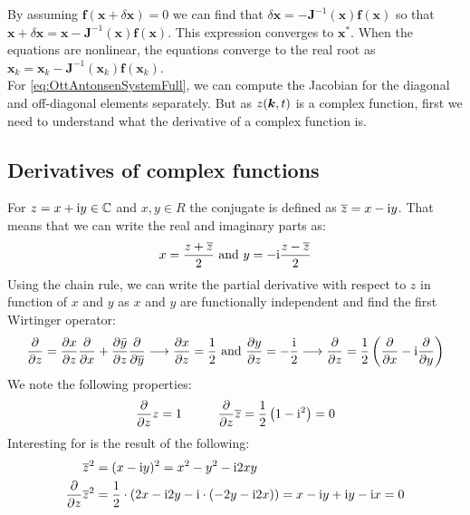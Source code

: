 By assuming $\boldsymbol{f}(\boldsymbol{x}+\delta \boldsymbol{x}) = 0$ we can find that $\delta \boldsymbol{x} = -\boldsymbol{J}^{-1}( \boldsymbol{x}) \boldsymbol{f}(\boldsymbol{x})$ so that $\boldsymbol{x} + \delta \boldsymbol{x} =  \boldsymbol{x} - \boldsymbol{J}^{-1} (\boldsymbol{x}) \boldsymbol{f}(\boldsymbol{x})$. This expression converges to $\boldsymbol{x^\ast}$. When the equations are nonlinear, the equations converge to the real root as $\boldsymbol{x}_k =  \boldsymbol{x}_k - \boldsymbol{J}^{-1} ( \boldsymbol{x}_k)\boldsymbol{f}(\boldsymbol{x}_k)$. \\

For \eqref{eq:OttAntonsenSystemFull}, we can compute the Jacobian for the diagonal and off-diagonal elements separately. But as $z({\boldsymbol{k}},t)$ is a complex function, first we need to understand what the derivative of a complex function is. 


\subsection{Derivatives of complex functions}
For $z = x + {\rm{i}} y \in {\mathbb{C}}$ and $x,y \in R$ the conjugate is defined as $\overline{z} = x - {\rm{i}} y$. That means that we can write the real and imaginary parts as:
\begin{align*}
x = \frac{z + \overline{z}}{2} \text{  and   }   y = -{\rm{i}} \frac{z - \overline{z}}{2}
\end{align*}
Using the chain rule, we can write the partial derivative with respect to $z$ in function of $x$ and $y$ as $x$ and $y$ are functionally independent and find the first Wirtinger operator:
\begin{align*}
\frac{\partial}{\partial z} =\frac{\partial x}{\partial z} \frac{\partial}{\partial x}+\frac{\partial \bar{y}}{\partial z} \frac{\partial}{\partial \overline{y}} 
\longrightarrow \frac{\partial x}{\partial z} = \frac{1}{2} \text{   and   } \frac{\partial y}{\partial z} =  - \frac{{\rm{i}}}{2} 
\longrightarrow \frac{\partial}{\partial z} = \frac{1}{2}\left(\frac{\partial}{\partial x} - {\rm{i}} \frac{\partial}{\partial y}\right)
\end{align*}
We note the following properties:
\begin{align*}
\frac{\partial}{\partial z} z = 1 \hspace{10mm} \frac{\partial}{\partial z}\overline{z} = \frac{1}{2}\left(1 - \ic^2 \right) = 0
\end{align*}
Interesting for is the result of the following: 
\begin{align*}
\overline{z}^2 &= (x - {\rm{i}} y)^2 = x^2 - y^2 - {\rm{i}} 2xy \\
\frac{\partial}{\partial z} \overline{z}^2 &=  \frac{1}{2}\cdot(2x -{\rm{i}} 2y - {\rm{i}}\cdot(-2y -{\rm{i}} 2x)) = x -{\rm{i}} y + {\rm{i}} y -{\rm{i}} x = 0
\end{align*}



